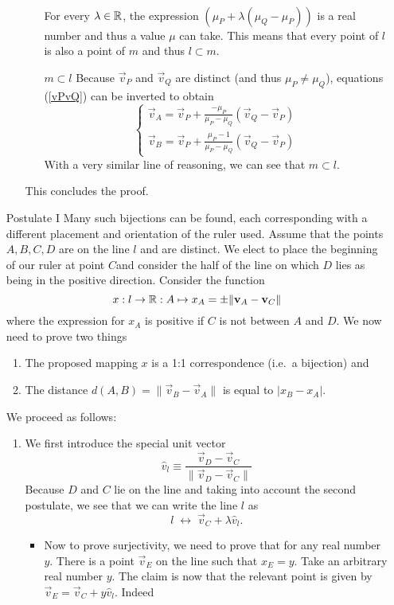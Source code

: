 \begin{enumerate}
\begin{enumerate}
\begin{enumerate}
\begin{align}
\end{align}
For every $\lambda \in \mathbb{R}$, the expression $(\mu_P + \lambda(\mu_Q - \mu_P))$ is a real number and thus a value $\mu$ can take. This means that every point of $l$ is also a point of $m$ and thus $l \subset m$.
\item[$\boxed{m \subset l}$] Because $\vec{v}_P$ and $\vec{v}_Q$ are distinct (and thus $\mu_P \neq \mu_Q$), equations (\ref{vPvQ}) can be inverted to obtain
\[ \begin{cases}
\vec{v}_A = \vec{v}_P + \frac{-\mu_P}{\mu_P - \mu_Q}(\vec{v}_Q - \vec{v}_P) \\
\vec{v}_B = \vec{v}_P + \frac{\mu_P-1}{\mu_P - \mu_Q}(\vec{v}_Q - \vec{v}_P)
\end{cases} \]
With a very similar line of reasoning, we can see that $m \subset l$.
\end{enumerate}
This concludes the proof.
\end{enumerate}
\item[Postulate I] Many such bijections can be found, each corresponding with a different placement and orientation of the ruler used. Assume that the points $A,B,C,D$ are on the line $l$ and are distinct. We elect to place the beginning of our ruler at point $C$and consider the half of the line on which $D$ lies as being in the positive direction. Consider the function
\[ x: l\to \mathbb{R}: A \mapsto x_A = \pm\lVert \boldsymbol{\mathrm{v}}_A - \boldsymbol{\mathrm{v}}_C \lVert \]
where the expression for $x_A$ is positive if $C$ is not between $A$ and $D$. We now need to prove two things
\begin{enumerate}
\item The proposed mapping $x$ is a 1:1 correspondence (i.e.\ a bijection) and
\item The distance $d(A,B) = \lVert \vec{v}_B - \vec{v}_A\lVert$ is equal to $|x_B - x_A|$.
\end{enumerate}
We proceed as follows:
\begin{enumerate}
\item We first introduce the special unit vector 
\[ \hat{v}_l \equiv \frac{\vec{v}_D - \vec{v}_C}{\lVert \vec{v}_D - \vec{v}_C\lVert} \]
Because $D$ and $C$ lie on the line and taking into account the second postulate, we see that we can write the line $l$ as
\[ l \;\leftrightarrow\; \vec{v}_C + \lambda \hat{v}_l. \]
\begin{itemize}
\item Now to prove surjectivity, we need to prove that for any real number $y$. There is a point $\vec{v}_E$ on the line such that $x_E = y$. Take an arbitrary real number $y$. The claim is now that the relevant point is given by $\vec{v}_E = \vec{v}_C + y \hat{v}_l$. Indeed

\end{itemize}
\end{enumerate}
\end{enumerate}
